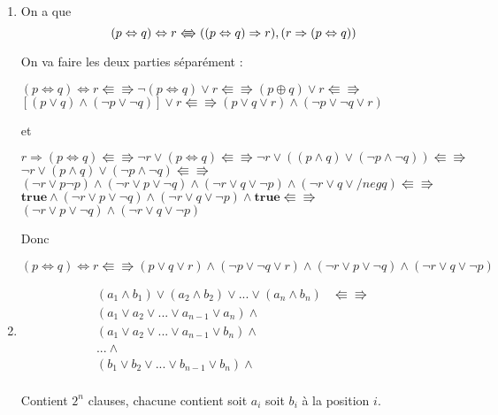 \begin{enumerate}
\begin{flushright}
\end{flushright}
	\item \hspace{1em}
	
On a que $$ (p \Leftrightarrow q) \Leftrightarrow r \Lleftarrow\!\!\!\!\Rrightarrow ((p\Leftrightarrow q) \Rightarrow r ) \and ( r \Rightarrow (p \Leftrightarrow q)) $$ 

On va faire les deux parties séparément :
\begin{flushright}
	$(p \Leftrightarrow q) \Leftrightarrow r \Lleftarrow\!\!\!\!\Rrightarrow \neg(p \Leftrightarrow q) \lor  r \Lleftarrow\!\!\!\!\Rrightarrow (p \oplus q) \lor r \Lleftarrow\!\!\!\!\Rrightarrow$\\
	$ [ (p \lor q) \land (\neg p \lor \neg q) ] \lor r \Lleftarrow\!\!\!\!\Rrightarrow (p \lor q \lor r) \land (\neg p \lor \neg q \lor r) $\\
\end{flushright}
et 
\begin{flushright}
	$ r \Rightarrow (p \Leftrightarrow q) \Lleftarrow\!\!\!\!\Rrightarrow \neg r \lor (p \Leftrightarrow q) \Lleftarrow\!\!\!\!\Rrightarrow  \neg r  \lor ( (p \land q) \lor (\neg p \land \neg q)) \Lleftarrow\!\!\!\!\Rrightarrow $\\
	$ \neg r \lor (p \land q) \lor (\neg p \land \neg q) \Lleftarrow\!\!\!\!\Rrightarrow $\\
	$ (\neg r \lor p \neg p) \land (\neg r \lor p \lor \neg q) \land (\neg r \lor q \lor \neg p) \land (\neg r \lor q \lor /neg q) \Lleftarrow\!\!\!\!\Rrightarrow $\\
	$ \textbf{true} \land (\neg r \lor p \lor \neg q) \land (\neg r \lor q \lor \neg p) \land  \textbf{true} \Lleftarrow\!\!\!\!\Rrightarrow $\\
	$ (\neg r \lor p \lor \neg q) \land (\neg r \lor q \lor \neg p) $\\	
\end{flushright}
Donc
\begin{flushright}
	$(p \Leftrightarrow q ) \Leftrightarrow r \Lleftarrow\!\!\!\!\Rrightarrow (p \lor q \lor r) \land (\neg p \lor \neg q \lor r) \land (\neg r \lor p \lor \neg q) \land (\neg r \lor q \lor \neg p)$ 
\end{flushright}
	
	\item \hspace{1em}
\begin{align*}
	(a_1 \land b_1) \lor (a_2 \land b_2) \lor ... \lor (a_n \land b_n) & \Lleftarrow\!\!\!\!\Rrightarrow \\
	(a_1 \lor a_2 \lor ... \lor a_{n-1} \lor a_n) \land &\\
	(a_1 \lor a_2 \lor ... \lor a_{n-1} \lor b_n) \land &\\
	... \land &\\
	(b_1 \lor b_2 \lor ... \lor b_{n-1} \lor b_n) \land &\\
\end{align*}

Contient $2^n$ clauses, chacune contient soit $a_i$ soit $b_i$ à la position $i$.

\end{enumerate}

